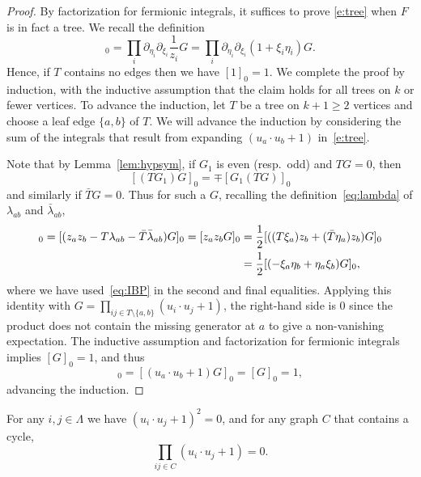 \documentclass[11pt]{amsart}
\numberwithin{equation}{section}
\numberwithin{theorem}{section}
\begin{document}
\begin{proof}
  By factorization for fermionic integrals, it suffices to prove
  \eqref{e:tree} when $F$ is in fact a tree.  We recall the definition
\begin{equation}
  [G]_0
  = \prod_i \partial_{\eta_i}\partial_{\xi_i} \frac{1}{z_i} G
= \prod_i \partial_{\eta_i}\partial_{\xi_i} (1+\xi_i\eta_i) G.
\end{equation}
Hence, if $T$ contains no
edges then we have $[1]_{0}=1$.
We complete the proof by induction, with the inductive assumption that
the claim holds for all trees on $k$ or fewer vertices.
To advance the induction, let $T$ be a tree on $k+1\geq 2$ vertices
and choose a leaf 
edge $\{a,b\}$ of $T$. We will advance the induction by considering
the sum of the integrals that result from expanding
$(u_{a}\cdot u_{b}+1)$ in~\eqref{e:tree}. 

Note that by Lemma~\ref{lem:hypsym}, if $G_{1}$ is even (resp.\  odd) and $TG=0$, then
\begin{equation}
  \label{eq:IBP}
  [(TG_{1})G]_0 = \mp [G_{1}(TG)]_0
\end{equation}
and similarly if $\bar T G = 0$. Thus for
such a $G$, recalling the definition~\eqref{eq:lambda} of
$\lambda_{ab}$ and $\bar\lambda_{ab}$, 
\begin{align}
  [(u_a\cdot u_b)G]_0
  = [(z_az_b-T\lambda_{ab}-\bar T\bar\lambda_{ab})G]_0
  = [z_az_bG]_0
  &= \frac12 [((T\xi_a)z_b+(\bar T\eta_a)z_b)G]_{0}
  \nnb
  &= \frac12 [(-\xi_a\eta_b+\eta_a\xi_b)G]_{0},
\end{align}
where we have used~\eqref{eq:IBP} in the second and final
equalities.  Applying this identity with
$G=\prod_{ij\in T\setminus\{a,b\}}(u_{i}\cdot u_{j}+1)$, the
right-hand side is $0$ since the product does not contain the missing
generator at $a$ to give a non-vanishing expectation. The inductive
assumption and factorization for fermionic integrals implies $[G]_0=1$, and thus
\begin{equation}
  [\prod_{ij \in T}(u_{i}\cdot u_{j}+1)]_0
  =
  [(u_a\cdot u_b+1)G]_0 = [G]_0 = 1,
\end{equation}
advancing the induction.
\end{proof}

\begin{lemma} 
  \label{lem:cycle} 
  For any $i,j\in\Lambda$ we have
  $(u_i\cdot u_j+1)^2=0$, and for any graph $C$ that contains a cycle,
  \begin{equation} \label{e:cycle}
    \prod_{ij \in C} (u_i\cdot u_j+1) = 0.
  \end{equation}
\end{lemma}
\end{document}

